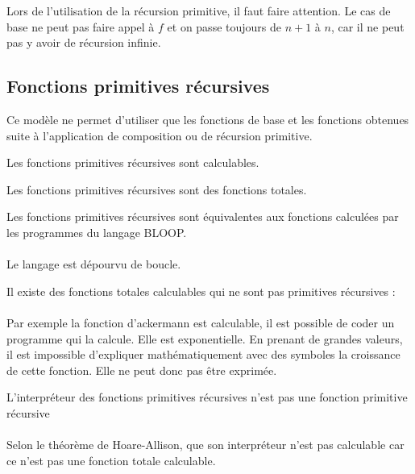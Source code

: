 \begin{myrem}
	Lors de l'utilisation de la récursion primitive, il faut faire
	attention. Le cas de base ne peut pas faire appel à $f$ et on passe
	toujours de $n+1$ à $n$, car il ne peut pas y avoir de récursion infinie.
\end{myrem}

\subsection{Fonctions primitives récursives}
Ce modèle ne permet d'utiliser que les fonctions de base et les fonctions
obtenues suite à l'application de composition ou de récursion primitive.

\begin{myprop}
	Les fonctions primitives récursives sont calculables.
\end{myprop}

\begin{myprop}
	Les fonctions primitives récursives sont des fonctions totales.
\end{myprop}

\begin{myprop}
	Les fonctions primitives récursives sont équivalentes aux fonctions calculées par les programmes du langage BLOOP.
\end{myprop}
\paragraph{} Le langage est dépourvu de boucle.

\begin{myprop}
	Il existe des fonctions totales calculables qui ne sont pas primitives récursives :
\end{myprop}
\paragraph{} Par exemple la fonction d’ackermann est calculable, il est possible de coder un programme qui la calcule. Elle est exponentielle. En prenant de grandes valeurs, il est impossible d’expliquer mathématiquement avec des symboles la croissance de cette fonction. Elle ne peut donc pas être exprimée.

\begin{myprop}
	L'interpréteur des fonctions primitives récursives n'est pas une fonction primitive récursive
\end{myprop}
\paragraph{} Selon le théorème de Hoare-Allison, que son interpréteur n'est pas calculable car ce n'est pas une fonction totale calculable.

